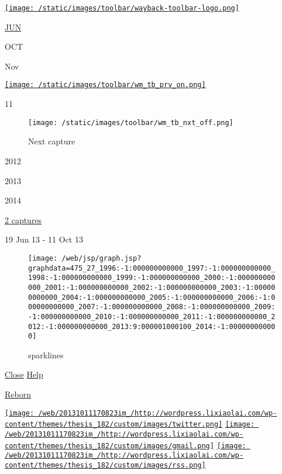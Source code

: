 \href{/web/}{\texttt{[image: /static/images/toolbar/wayback-toolbar-logo.png]}}

\href{/web/20130619202105/http://wordpress.lixiaolai.com/archives/9336.html}{JUN}

OCT

Nov

\href{/web/20130619202105/http://wordpress.lixiaolai.com/archives/9336.html}{\texttt{[image: /static/images/toolbar/wm\_tb\_prv\_on.png]}}

11

\begin{figure}[htbp]
\centering
\texttt{[image: /static/images/toolbar/wm\_tb\_nxt\_off.png]}
\caption{Next capture}
\end{figure}

2012

2013

2014

\href{/web/20131011170823*/http://wordpress.lixiaolai.com/archives/9336.html}{2
captures}

19 Jun 13 - 11 Oct 13

\href{}{}

\begin{figure}[htbp]
\centering
\texttt{[image: /web/jsp/graph.jsp?graphdata=475\_27\_1996:-1:000000000000\_1997:-1:000000000000\_1998:-1:000000000000\_1999:-1:000000000000\_2000:-1:000000000000\_2001:-1:000000000000\_2002:-1:000000000000\_2003:-1:000000000000\_2004:-1:000000000000\_2005:-1:000000000000\_2006:-1:000000000000\_2007:-1:000000000000\_2008:-1:000000000000\_2009:-1:000000000000\_2010:-1:000000000000\_2011:-1:000000000000\_2012:-1:000000000000\_2013:9:000001000100\_2014:-1:000000000000]}
\caption{sparklines}
\end{figure}

\hyperref[close]{Close} \href{http://faq.web.archive.org/}{Help}

\href{/web/20131011170823/http://wordpress.lixiaolai.com/}{Reborn}

\href{/web/20131011170823/https://twitter.com/xiaolai}{\texttt{[image: /web/20131011170823im\_/http://wordpress.lixiaolai.com/wp-content/themes/thesis\_182/custom/images/twitter.png]}}
\href{mailto:lixiaolai@gmail.com}{\texttt{[image: /web/20131011170823im\_/http://wordpress.lixiaolai.com/wp-content/themes/thesis\_182/custom/images/gmail.png]}}
\href{/web/20131011170823/http://wordpress.lixiaolai.com/feed}{\texttt{[image: /web/20131011170823im\_/http://wordpress.lixiaolai.com/wp-content/themes/thesis\_182/custom/images/rss.png]}}

